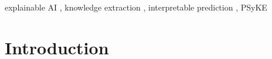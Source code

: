 \documentclass[
]{ceurart}
\begin{document}
\begin{keywords}
	explainable AI 
	\sep
  	knowledge extraction 
	\sep
	interpretable prediction 
	\sep
  	PSyKE
\end{keywords}

\maketitle

\section{Introduction}



\end{document}
